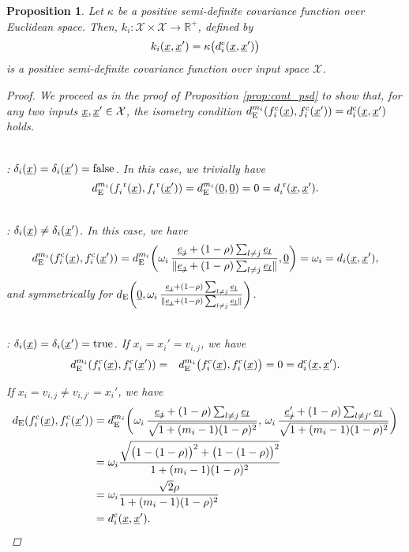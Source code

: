 \documentclass[letterpaper]{article}
\newcommand{\vect}[1]{\underline{\smash{#1}}}
\renewcommand{\v}[1]{\vect{#1}}
\newcommand{\reals}{\mathds{R}}
\newcommand{\sX}{\mathcal{X}}
\newcommand{\br}{^{\text{\textnormal{ r}}}}
\newcommand{\cat}{^{\text{\textnormal{c}}}}
\newtheorem{prop}[thm]{Proposition}
\begin{document}
\begin{prop}
Let $\kappa$ be a positive semi-definite covariance function over Euclidean space.
Then, $k_i\colon \sX \times \sX\to \reals^+$, defined by 
\[k_i(\v{x},\v{x}') = \kappa\bigl( d\cat_i(\v{x}, \v{x}') \bigr)\]
is a positive semi-definite covariance function over input space $\sX$. 
\label{prop:cat_psd}
\begin{proof}
We proceed as in the proof of Proposition \ref{prop:cont_psd} to show that, for any two inputs $\v{x},\v{x}' \in \sX$, the isometry condition $d_{\text{E}}^{m_i}(f\cat_i(\v{x}),f\cat_i(\v{x}')) = d\cat_i(\v{x},\v{x}')$ holds.

~\\: $\delta_i(\v{x}) = \delta_i(\v{x}') = \textrm{false}$.
In this case, we trivially have 
\[d_{\text{E}}^{m_i}(f_i\br(\v{x}),f_i\br(\v{x}')) = d_{\text{E}}^{m_i}(\v{0}, \v{0}) = 0 = d_i\br(\v{x},\v{x}').\]

~\\: $\delta_i(\v{x}) \neq \delta_i(\v{x}')$. In this case, we have
\[d_{\text{E}}^{m_i}(f\cat_i(\v{x}),f\cat_i(\v{x}')) = 
d_{\text{E}}^{m_i}\biggl(\omega_i\,\frac{\v{e_j}+(1-\rho)\sum_{l\neq j} \v{e_l}}
{\|\v{e_j}+(1-\rho)\sum_{l\neq j} \v{e_l}\|}, \v{0}\biggr) 
= \omega_i = d_i(\v{x},\v{x}'),\]
and symmetrically for $d_{\text{E}}\biggl(\v{0}, \omega_i\,\frac{\v{e_j}+(1-\rho)\sum_{l\neq j} \v{e_l}}
{\|\v{e_j}+(1-\rho)\sum_{l\neq j} \v{e_l}\|}\biggr)$.

~\\: $\delta_i(\v{x}) = \delta_i(\v{x}') = \textrm{true}$. 
If $x_i=x_i'=v_{i,j}$, we have 
\begin{eqnarray}
\nonumber{}d_{\text{E}}^{m_i}(f\cat_i(\v{x}),f\cat_i(\v{x}')) & = & d_{\text{E}}^{m_i}\bigl(
f\cat_i(\v{x}),f\cat_i(\v{x})
\bigr) = 0 = d\cat_i(\v{x}, \v{x}').
\end{eqnarray}

\noindent{}If $x_i=v_{i,j} \neq v_{i,j'} = x_i'$, we have 
\begin{align} 
\nonumber{}d_{\text{E}}(f\cat_i(\v{x}),f\cat_i(\v{x}')) & = 
d_{\text{E}}^{m_i}\biggl(
\omega_i\,\frac{\v{e_j}+(1-\rho)\sum_{l\neq j} \v{e_l}}
{\sqrt{1+(m_i-1)(1-\rho)^2}},\,
\omega_i\,\frac{\v{e_j'}+(1-\rho)\sum_{l\neq j'} \v{e_l}}
{\sqrt{1+(m_i-1)(1-\rho)^2}}
\biggr) \\
& = \omega_i \frac{\sqrt{\bigl(1-(1-\rho)\bigr)^2 + \bigl(1-(1-\rho)\bigr)^2}}
{1+(m_i-1)(1-\rho)^2} \nonumber\\
& = \omega_i \frac{\sqrt{2} \rho}
{1+(m_i-1)(1-\rho)^2} \nonumber\\
& = d\cat_i(\v{x}, \v{x}').
\end{align}
\end{proof}
\end{prop}
\end{document}
